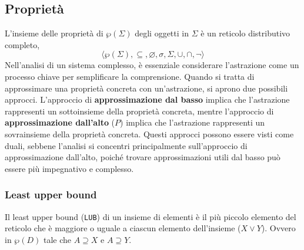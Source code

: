 \subsection{Proprietà}
L'insieme delle proprietà di $\wp(\Sigma)$ degli oggetti in $\Sigma$ è un reticolo distributivo completo, 
\[
  \langle \wp(\Sigma), \subseteq, \varnothing, \sigma, \Sigma, \cup, \cap, \neg  \rangle 
\]
Nell'analisi di un sistema complesso, è essenziale considerare l'astrazione come un processo chiave
per semplificare la comprensione. Quando si tratta di approssimare una proprietà concreta con
un'astrazione, si aprono due possibili approcci.
L'approccio di \textbf{approssimazione dal basso} implica che l'astrazione rappresenti un sottoinsieme
della proprietà concreta,
mentre l'approccio di \textbf{approssimazione dall'alto} ($P$) implica che l'astrazione rappresenti un
sovrainsieme della proprietà concreta. Questi approcci possono essere visti come duali,
sebbene l'analisi si concentri principalmente sull'approccio di approssimazione dall'alto,
poiché trovare approssimazioni utili dal basso può essere più impegnativo e complesso.

\begin{figure}[H]
  \centering
\end{figure}
\subsubsection{Least upper bound}
Il least upper bound (\verb|LUB|) di un insieme di elementi è il più piccolo
elemento del reticolo che è maggiore o uguale a ciascun elemento dell'insieme ($X \lor Y$).
Ovvero in $\wp(D)$ tale che $A \supseteq X$ e $A \supseteq Y$.
\begin{figure}[H]
  \centering
\end{figure}
